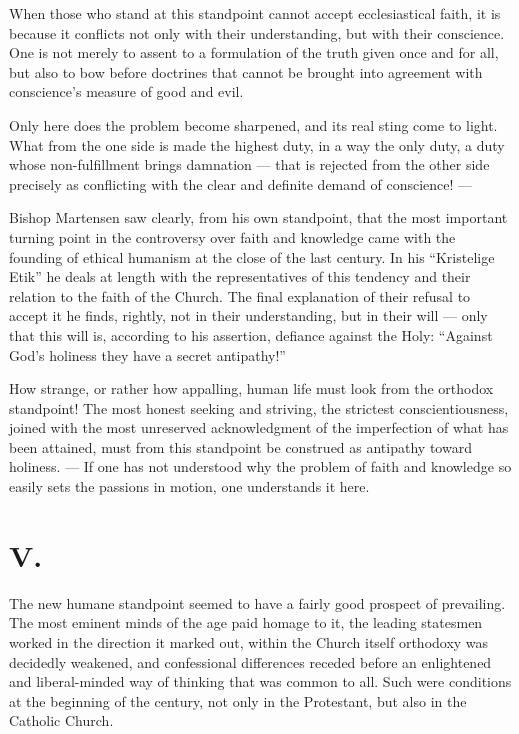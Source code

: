 \documentclass[12pt,a4paper,openany]{book}
\newcommand{\opage}[1]{\marginnote{\footnotesize\textit{[#1]}}}
\begin{document}
When those who stand at this standpoint cannot accept ecclesiastical faith, it
is because it conflicts not only with their understanding, but with their
conscience. One is not merely to assent to a formulation of the truth given
once and for all, but also to bow before doctrines that cannot be brought into
agreement with conscience's measure of good and evil.

Only here does the problem become sharpened, and its real sting come to light.
What from the one side is made the highest duty, in a way the only duty, a
duty whose non-fulfillment brings damnation --- that is rejected from the
other side precisely as conflicting with the clear and definite demand of
conscience! ---

Bishop Martensen saw clearly, from his own standpoint, that the most important
turning point in the controversy over faith and knowledge came with the
founding of ethical humanism at the close of the last century. In his
``Kristelige Etik'' he deals at length with the representatives of this
tendency and their relation to the faith of the Church. The final explanation
of their refusal to accept it he finds, rightly, not in their understanding,
but in their will --- only that this will is, according to his assertion,
defiance against the Holy: ``Against God's holiness they have a secret
antipathy!''

How strange, or rather how appalling, human life must look from the orthodox
standpoint! The most honest seeking and striving, the strictest
conscientiousness, joined with the most unreserved acknowledgment of the
imperfection of what has been attained, must from this standpoint be construed
as antipathy toward holiness. --- If one has not understood why the problem of
faith and knowledge so easily sets the passions in motion, one understands it
here.

\opage{202}
\section*{V.}

The new humane standpoint seemed to have a fairly good prospect of prevailing.
The most eminent minds of the age paid homage to it, the leading statesmen
worked in the direction it marked out, within the Church itself orthodoxy was
decidedly weakened, and confessional differences receded before an enlightened
and liberal-minded way of thinking that was common to all. Such were
conditions at the beginning of the century, not only in the Protestant, but
also in the Catholic Church.
\end{document}
